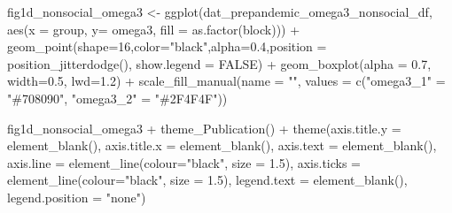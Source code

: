 \documentclass[
]{article}
\newenvironment{Shaded}{\begin{snugshade}}{\end{snugshade}}
\newcommand{\AttributeTok}[1]{\textcolor[rgb]{0.77,0.63,0.00}{#1}}
\newcommand{\ConstantTok}[1]{\textcolor[rgb]{0.00,0.00,0.00}{#1}}
\newcommand{\DecValTok}[1]{\textcolor[rgb]{0.00,0.00,0.81}{#1}}
\newcommand{\FloatTok}[1]{\textcolor[rgb]{0.00,0.00,0.81}{#1}}
\newcommand{\FunctionTok}[1]{\textcolor[rgb]{0.00,0.00,0.00}{#1}}
\newcommand{\NormalTok}[1]{#1}
\newcommand{\OtherTok}[1]{\textcolor[rgb]{0.56,0.35,0.01}{#1}}
\newcommand{\SpecialCharTok}[1]{\textcolor[rgb]{0.00,0.00,0.00}{#1}}
\newcommand{\StringTok}[1]{\textcolor[rgb]{0.31,0.60,0.02}{#1}}
\begin{document}
\begin{Shaded}
\begin{Highlighting}[]
\NormalTok{fig1d\_nonsocial\_omega3 }\OtherTok{\textless{}{-}} \FunctionTok{ggplot}\NormalTok{(dat\_prepandemic\_omega3\_nonsocial\_df, }\FunctionTok{aes}\NormalTok{(}\AttributeTok{x =}\NormalTok{ group,}
                                                                          \AttributeTok{y=}\NormalTok{ omega3,}
                                                                          \AttributeTok{fill =} \FunctionTok{as.factor}\NormalTok{(block))) }\SpecialCharTok{+}
  \FunctionTok{geom\_point}\NormalTok{(}\AttributeTok{shape=}\DecValTok{16}\NormalTok{,}\AttributeTok{color=}\StringTok{"black"}\NormalTok{,}\AttributeTok{alpha=}\FloatTok{0.4}\NormalTok{,}\AttributeTok{position =} \FunctionTok{position\_jitterdodge}\NormalTok{(), }\AttributeTok{show.legend =} \ConstantTok{FALSE}\NormalTok{) }\SpecialCharTok{+} 
  \FunctionTok{geom\_boxplot}\NormalTok{(}\AttributeTok{alpha =} \FloatTok{0.7}\NormalTok{, }\AttributeTok{width=}\FloatTok{0.5}\NormalTok{, }\AttributeTok{lwd=}\FloatTok{1.2}\NormalTok{) }\SpecialCharTok{+}
  \FunctionTok{scale\_fill\_manual}\NormalTok{(}\AttributeTok{name =} \StringTok{""}\NormalTok{, }
                    \AttributeTok{values =} \FunctionTok{c}\NormalTok{(}\StringTok{"omega3\_1"} \OtherTok{=} \StringTok{"\#708090"}\NormalTok{, }\StringTok{"omega3\_2"} \OtherTok{=} \StringTok{"\#2F4F4F"}\NormalTok{))}


\NormalTok{fig1d\_nonsocial\_omega3 }\SpecialCharTok{+} \FunctionTok{theme\_Publication}\NormalTok{() }\SpecialCharTok{+} \FunctionTok{theme}\NormalTok{(}\AttributeTok{axis.title.y =} \FunctionTok{element\_blank}\NormalTok{(),}
                                                     \AttributeTok{axis.title.x =} \FunctionTok{element\_blank}\NormalTok{(),}
                                                     \AttributeTok{axis.text =} \FunctionTok{element\_blank}\NormalTok{(), }
                                                     \AttributeTok{axis.line =} \FunctionTok{element\_line}\NormalTok{(}\AttributeTok{colour=}\StringTok{"black"}\NormalTok{, }\AttributeTok{size =} \FloatTok{1.5}\NormalTok{),}
                                                     \AttributeTok{axis.ticks =} \FunctionTok{element\_line}\NormalTok{(}\AttributeTok{colour=}\StringTok{"black"}\NormalTok{, }\AttributeTok{size =} \FloatTok{1.5}\NormalTok{),}
                                                     \AttributeTok{legend.text =} \FunctionTok{element\_blank}\NormalTok{(),}
                                                     \AttributeTok{legend.position =} \StringTok{"none"}\NormalTok{)}
\end{Highlighting}
\end{Shaded}
\end{document}
